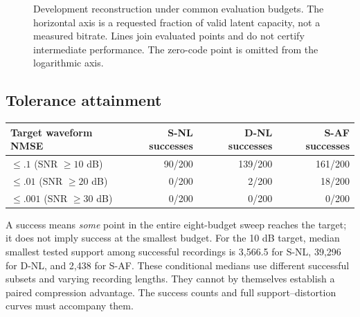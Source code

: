 \documentclass[11pt,a4paper]{article}
\begin{document}
\begin{figure}[htbp]
\centering
{}
\caption{Development reconstruction under common evaluation budgets. The horizontal axis is a requested fraction of valid latent capacity, not a measured bitrate. Lines join evaluated points and do not certify intermediate performance. The zero-code point is omitted from the logarithmic axis.}
\label{fig:curves}
\end{figure}

\subsection{Tolerance attainment}
\begin{center}
\begin{tabular}{lrrr}
\toprule
Target waveform NMSE & S-NL successes & D-NL successes & S-AF successes \\
\midrule
$\leq.1$ (SNR $\geq10$ dB) & 90/200 & 139/200 & 161/200 \\
$\leq.01$ (SNR $\geq20$ dB) & 0/200 & 2/200 & 18/200 \\
$\leq.001$ (SNR $\geq30$ dB) & 0/200 & 0/200 & 0/200 \\
\bottomrule
\end{tabular}
\end{center}
A success means \emph{some} point in the entire eight-budget sweep reaches the target; it does not imply success at the smallest budget. For the 10 dB target, median smallest tested support among successful recordings is 3,566.5 for S-NL, 39,296 for D-NL, and 2,438 for S-AF. These conditional medians use different successful subsets and varying recording lengths. They cannot by themselves establish a paired compression advantage. The success counts and full support--distortion curves must accompany them.
\end{document}
